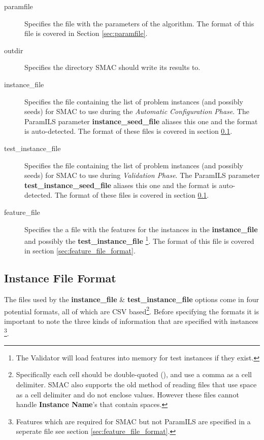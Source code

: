 \documentclass[manual.tex]{subfiles}
\begin{document}
\begin{description}
\item [{paramfile}] Specifies the file with the parameters of the algorithm.
The format of this file is covered in Section \ref{sec:paramfile}.
\item [{outdir}] Specifies the directory SMAC should write its results
to. 
\item [{instance\_file}] Specifies the file containing the list of problem instances (and possibly seeds) for SMAC to use during the \emph{Automatic Configuration Phase}. The ParamILS parameter \textbf{instance\_seed\_file} aliases this one and the format is auto-detected. The format of these files is covered in section \ref{sec:instance_file_format}.
\item [{test\_instance\_file}] Specifies the file containing the list of problem instances (and possibly seeds) for SMAC to use during \emph{Validation Phase}. The ParamILS parameter \textbf{test\_instance\_seed\_file} aliases this one and the format is auto-detected. The format of these files is covered in section \ref{sec:instance_file_format}.
\item [{feature\_file}] Specifies the a file with the features for the instances in the \textbf{instance\_file} and possibly the \textbf{test\_instance\_file} \footnote{The Validator will load features into memory for test instances if they exist.}. The format of this file is covered in section \ref{sec:feature_file_format}.

\end{description}

\subsection{Instance File Format} \label{sec:instance_file_format}


The files used by the \textbf{instance\_file} \& \textbf{test\_instance\_file} options 
come in four potential formats, all of which are CSV based\footnote{Specifically each cell should be double-quoted (), and use a comma as a cell delimiter. SMAC also supports the old method of reading files that use space as a cell delimiter and do not enclose values. However these files cannot handle \textbf{Instance Name}'s that contain spaces.}. Before specifying the formats it is important to note the three kinds of information that are specified with instances \footnote{Features which are required for SMAC but not ParamILS are specified in a seperate file see section \ref{sec:feature_file_format}.}.
\end{document}
